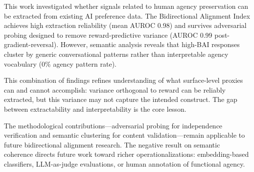 
This work investigated whether signals related to human agency preservation can be extracted from existing AI preference data. The Bidirectional Alignment Index achieves high extraction reliability (mean AUROC 0.98) and survives adversarial probing designed to remove reward-predictive variance (AUROC 0.99 post-gradient-reversal). However, semantic analysis reveals that high-BAI responses cluster by generic conversational patterns rather than interpretable agency vocabulary (0\% agency pattern rate).

This combination of findings refines understanding of what surface-level proxies can and cannot accomplish: variance orthogonal to reward can be reliably extracted, but this variance may not capture the intended construct. The gap between extractability and interpretability is the core lesson.

The methodological contributions---adversarial probing for independence verification and semantic clustering for content validation---remain applicable to future bidirectional alignment research. The negative result on semantic coherence directs future work toward richer operationalizations: embedding-based classifiers, LLM-as-judge evaluations, or human annotation of functional agency.
